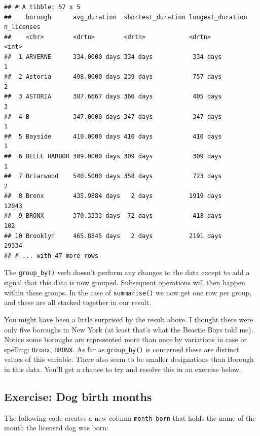 \documentclass[]{Nemilov}
\newenvironment{Shaded}{\begin{snugshade}}{\end{snugshade}}
\newcommand{\DataTypeTok}[1]{\textcolor[rgb]{0.13,0.29,0.53}{#1}}
\newcommand{\KeywordTok}[1]{\textcolor[rgb]{0.13,0.29,0.53}{\textbf{#1}}}
\newcommand{\NormalTok}[1]{#1}
\newcommand{\OperatorTok}[1]{\textcolor[rgb]{0.81,0.36,0.00}{\textbf{#1}}}
\newcommand{\OtherTok}[1]{\textcolor[rgb]{0.56,0.35,0.01}{#1}}
\newcommand{\StringTok}[1]{\textcolor[rgb]{0.31,0.60,0.02}{#1}}
\begin{document}
\begin{verbatim}
## # A tibble: 57 x 5
##    borough      avg_duration  shortest_duration longest_duration n_licenses
##    <chr>        <drtn>        <drtn>            <drtn>                <int>
##  1 ARVERNE      334.0000 days 334 days           334 days                 1
##  2 Astoria      498.0000 days 239 days           757 days                 2
##  3 ASTORIA      387.6667 days 366 days           405 days                 3
##  4 B            347.0000 days 347 days           347 days                 1
##  5 Bayside      410.0000 days 410 days           410 days                 1
##  6 BELLE HARBOR 309.0000 days 309 days           309 days                 1
##  7 Briarwood    540.5000 days 358 days           723 days                 2
##  8 Bronx        435.9884 days   2 days          1919 days             12043
##  9 BRONX        370.3333 days  72 days           418 days               102
## 10 Brooklyn     465.8845 days   2 days          2191 days             29334
## # ... with 47 more rows
\end{verbatim}

The \texttt{group\_by()} verb doesn't perform any changes to the data except to add a signal that this data is now grouped. Subsequent operations will then happen within these groups. In the case of \texttt{summarise()} we now get one row per group, and these are all stacked together in our result.

You might have been a little surprised by the result above. I thought there were only five boroughs in New York (at least that's what the Beastie Boys told me). Notice some boroughs are represented more than once by variations in case or spelling: \texttt{Bronx}, \texttt{BRONX}. As far as \texttt{group\_by()} is concerned these are distinct values of this variable. There also seem to be smaller designations than Borough in this data. You'll get a chance to try and resolve this in an exercise below.

\hypertarget{exercise-dog-birth-months}{%
\subsection{Exercise: Dog birth months}\label{exercise-dog-birth-months}}

The following code creates a new column \texttt{month\_born} that holds the name of the month the licensed dog was born:

\begin{Shaded}
\end{Shaded}
\end{document}
